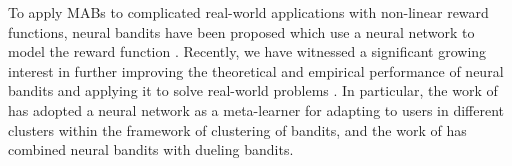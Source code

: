 To apply MABs to complicated real-world applications with non-linear reward functions, neural bandits have been proposed which use a neural network to model the reward function \cite{zhou2020neural,zhang2020neural}.
Recently, we have witnessed a significant growing interest in further improving the theoretical and empirical performance of neural bandits and applying it to solve real-world problems \cite{xu2020neural,kassraie2021neural,gu2021batched,nabati2021online,lisicki2021empirical,ban2021ee,ban2021convolutional,jia2021learning,nguyen2021offline,zhu2021pure,kassraie2022graph,salgia2022provably,dai2022sample,hwang2023combinatorial,qi2023graph,qi2024meta}.
In particular, the work of \citet{ban2024meta} has adopted a neural network as a meta-learner for adapting to users in different clusters within the framework of clustering of bandits, and the work of \citet{verma2024neural} has combined neural bandits with dueling bandits.
